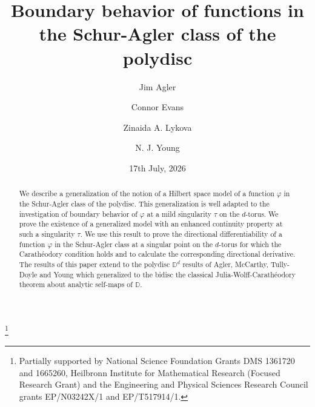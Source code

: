 \documentclass[11pt, reqno]{amsart}
\newcommand\1{\boldsymbol {1}}
\numberwithin{equation}{section}
\begin{document}
\title{Boundary behavior of functions in the Schur-Agler class of the polydisc}

\author{Jim Agler}
\address{Department of Mathematics, University of California at San Diego, CA \textup{92103}, USA}

\author{Connor Evans}
\address{School of Mathematics,  Statistics and Physics, Newcastle University, Newcastle upon Tyne NE\textup{1} \textup{7}RU, U.K.}


\author{Zinaida A. Lykova}
\address{School of Mathematics,  Statistics and Physics, Newcastle University, Newcastle upon Tyne	NE\textup{1} \textup{7}RU, U.K.}

\author{N. J. Young}
\address{School of Mathematics, Statistics and Physics, Newcastle University, Newcastle upon Tyne NE1 7RU, U.K.}

\date{17th July, 2026}


\thanks{Partially supported by National Science Foundation Grants
	DMS 1361720 and 1665260, Heilbronn Institute for Mathematical Research (Focused Research Grant) and the Engineering and Physical Sciences Research Council grants EP/N03242X/1 and EP/T517914/1. } 

\begin{abstract}
We describe a generalization of the notion of a Hilbert space model of a function $\varphi$ in the Schur-Agler class of the polydisc.  This generalization is well adapted to the investigation of boundary behavior of $\varphi$ at a mild singularity $\tau$ on the $d$-torus.  We prove the existence of a generalized model with an enhanced continuity property at such a singularity $\tau$. We use this result to prove the directional differentiability of a function $\varphi$ in the Schur-Agler class at a singular point on the  $d$-torus for which the Carath\'eodory condition holds and to calculate the corresponding directional derivative. The results of this paper extend to the polydisc $\mathbb{D}^d$ results of Agler, McCarthy, Tully-Doyle and Young which generalized to the bidisc the classical Julia-Wolff-Carath\'{e}odory theorem about analytic self-maps of $\mathbb{D}$. 
\end{abstract}
\end{document}
